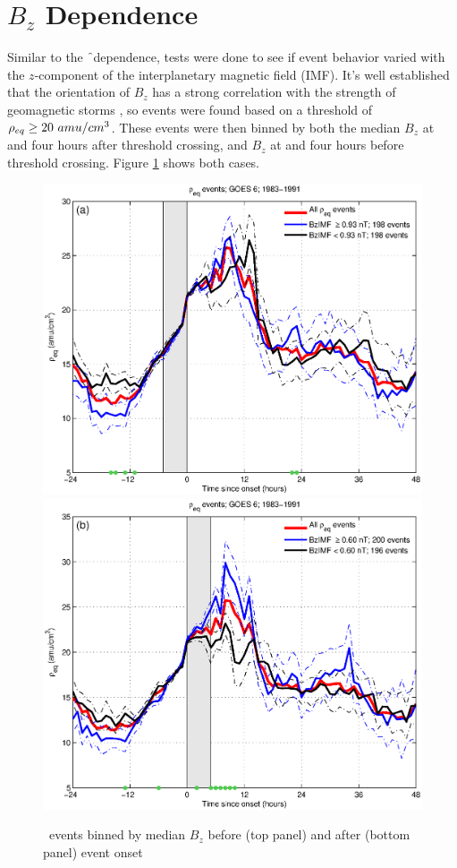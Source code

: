 \section{$B_z$ Dependence}

Similar to the \f\ dependence, tests were done to see if event behavior varied with the $z$-component of the interplanetary magnetic field (IMF). It's well established that the orientation of $B_z$ has a strong correlation with the strength of geomagnetic storms \citep{Takahashi2010SolarCycleVariation}, so events were found based on a threshold of $\rho_{eq} \geq 20~amu/cm^3$. These events were then binned by both the median $B_z$ at and four hours after threshold crossing, and $B_z$ at and four hours before threshold crossing. Figure \ref{fig:RhoBinnedBz} shows both cases.

\begin{figure}[htp!]
	\centering
	\includegraphics[width=0.7\linewidth]{Figures/RhoBinnedBzIMF-case24-t020-tf25-GOES6}
	\includegraphics[width=0.7\linewidth]{Figures/RhoBinnedBzIMF-case24-t025-tf30-GOES6}	
	\caption{\req\ events binned by median $B_z$ before (top panel) and after (bottom panel) event onset}
	\label{fig:RhoBinnedBz}
\end{figure}

